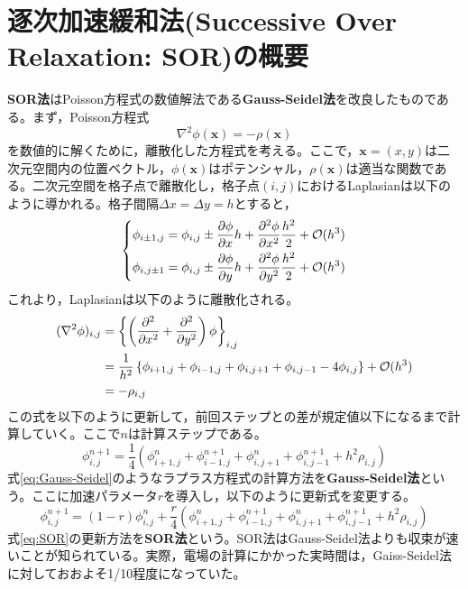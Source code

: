 \documentclass[autodetect-engine,dvi=dvipdfmx,a4paper,ja=standard,oneside,openany,11pt,draft]{bxjsbook}
\begin{document}
\section{逐次加速緩和法(Successive Over Relaxation: SOR)の概要}
\label{sec:SOR}
\textbf{SOR法}はPoisson方程式の数値解法である\textbf{Gauss-Seidel法}を改良したものである。まず，Poisson方程式
\begin{equation}
  \nabla^2\phi(\bm{x})=-\rho(\bm{x})
  \label{eq:poisson}
\end{equation}
を数値的に解くために，離散化した方程式を考える。ここで，$\bm{x}=(x,y)$は二次元空間内の位置ベクトル，$\phi(\bm{x})$はポテンシャル，$\rho(\bm{x})$は適当な関数である。二次元空間を格子点で離散化し，格子点$(i,j)$におけるLaplasianは以下のように導かれる。格子間隔$\Delta x=\Delta y=h$とすると，
\begin{equation}
  \left\{
  \begin{aligned}
    \phi_{i\pm1,j} & =\phi_{i,j}\pm \pdv{\phi}{x}h+\pdv[2]{\phi}{x}\frac{h^2}{2}+\mathcal{O}(h^3) \\
    \phi_{i,j\pm1} & =\phi_{i,j}\pm \pdv{\phi}{y}h+\pdv[2]{\phi}{y}\frac{h^2}{2}+\mathcal{O}(h^3)
  \end{aligned}
  \right.
  \label{eq:discrete_laplasian}
\end{equation}
これより，Laplasianは以下のように離散化される。
\begin{equation}
  \begin{split}
    (\nabla^2\phi)_{i,j} & =\left\{\left(\pdv*[2]{}{x}+\pdv*[2]{}{y}\right)\phi\right\}_{i,j}                                            \\
                         & =\frac{1}{h^2}\left\{\phi_{i+1,j}+\phi_{i-1,j}+\phi_{i,j+1}+\phi_{i,j-1}-4\phi_{i,j}\right\}+\mathcal{O}(h^3) \\
                         & =-\rho_{i,j}
  \end{split}
  \label{eq:discrete_poisson}
\end{equation}
この式を以下のように更新して，前回ステップとの差が規定値以下になるまで計算していく。ここで$n$は計算ステップである。
\begin{equation}
  \phi_{i,j}^{n+1}=\frac{1}{4}\left(\phi_{i+1,j}^{n}+\phi_{i-1,j}^{n+1}+\phi_{i,j+1}^{n}+\phi_{i,j-1}^{n+1}+h^2\rho_{i,j}\right)
  \label{eq:Gauss-Seidel}
\end{equation}
式\ref{eq:Gauss-Seidel}のようなラプラス方程式の計算方法を\textbf{Gauss-Seidel法}という。ここに加速パラメータ$r$を導入し，以下のように更新式を変更する。
\begin{equation}
  \phi_{i,j}^{n+1}=(1-r)\phi_{i,j}^{n}+\frac{r}{4}\left(\phi_{i+1,j}^{n}+\phi_{i-1,j}^{n+1}+\phi_{i,j+1}^{n}+\phi_{i,j-1}^{n+1}+h^2\rho_{i,j}\right)
  \label{eq:SOR}
\end{equation}
式\ref{eq:SOR}の更新方法を\textbf{SOR法}という。SOR法はGauss-Seidel法よりも収束が速いことが知られている。実際，電場の計算にかかった実時間は，Gaiss-Seidel法に対しておおよそ1/10程度になっていた。
\end{document}
